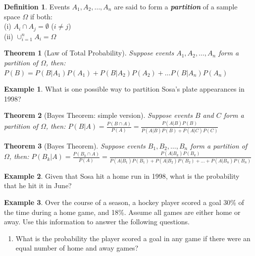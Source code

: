 \documentclass[
  11pt,
]{book}
\providecommand{\tightlist}{%
  \setlength{\itemsep}{0pt}\setlength{\parskip}{0pt}}
\newtheorem{theorem}{Theorem}[chapter]
\theoremstyle{definition}
\newtheorem{definition}{Definition}[chapter]
\theoremstyle{definition}
\newtheorem{example}{Example}[chapter]
\theoremstyle{definition}
\theoremstyle{definition}
\theoremstyle{remark}
\begin{document}
\vfill

\begin{definition}
Events \(A_1, A_2, \ldots, A_n\) are said to form a \textbf{\emph{partition}} of a sample space \(\Omega\) if both:\\
(i) \(A_i \cap A_j = \emptyset\) (\(i \neq j\))\\
(ii) \(\cup_{i=1}^n A_i = \Omega\)\\

\end{definition}

\begin{theorem}[Law of Total Probability]
Suppose events \(A_1, A_2, \ldots, A_n\) form a partition of \(\Omega\), then:
\(P(B) = P(B|A_1)P(A_1) + P(B|A_2)P(A_2) + \ldots P(B|A_n)P(A_n)\)
\end{theorem}

\begin{example}
What is one possible way to partition Sosa's plate appearances in 1998?
\end{example}

\vfill

\begin{theorem}[Bayes Theorem: simple version]
Suppose events \(B\) and \(C\) form a partition of \(\Omega\), then:
\(P(B|A) = \frac{P(B \cap A)}{P(A)} = \frac{P(A|B)P(B)}{P(A|B)P(B)+P(A|C)P(C)}\)
\end{theorem}

\begin{theorem}[Bayes Theorem]
Suppose events \(B_1, B_2, \ldots, B_n\) form a partition of \(\Omega\), then:
\(P(B_k|A) = \frac{P(B_k \cap A)}{P(A)} = \frac{P(A|B_k)P(B_k)}{P(A|B_1)P(B_1)+P(A|B_2)P(B_2) + \ldots + P(A|B_n)P(B_n)}\)
\end{theorem}

\begin{example}
Given that Sosa hit a home run in 1998, what is the probability that he hit it in June?
\end{example}

\vfill

\newpage

\begin{example}
Over the course of a season, a hockey player scored a goal 30\% of the time during a home game, and 18\%. Assume all games are either home or away. Use this information to answer the following questions.
\end{example}

\begin{enumerate}
\def\labelenumi{(\alph{enumi})}
\tightlist
\item
  What is the probability the player scored a goal in any game if there were an equal number of home and away games?\\
\end{enumerate}
\end{document}

